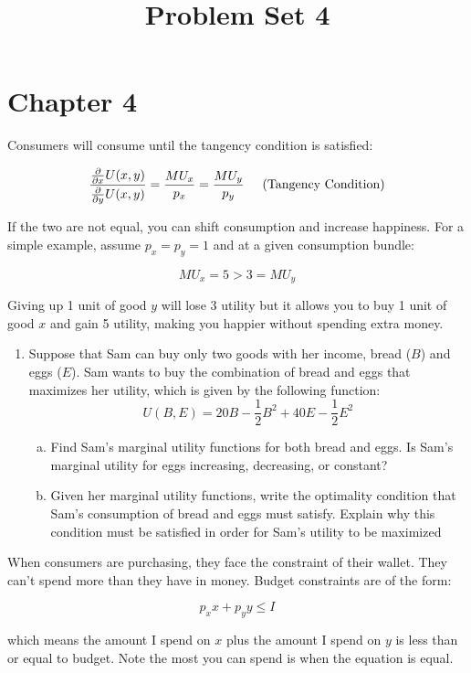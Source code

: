 \documentclass[11pt]{article}
\title{Problem Set 4}
\begin{document}
  
\section*{Chapter 4}

\begin{tcolorbox}[title= {\bf Optimal Consumption:}]
  Consumers will consume until the tangency condition is satisfied:

  $$\frac{\frac{\partial}{\partial x} U(x,y)}{\frac{\partial}{\partial y} U(x,y)} =  \frac{MU_x}{p_x} = \frac{MU_y}{p_y} \hspace{5mm} \text{(Tangency Condition)} $$

  \vspace{2.5mm}
  If the two are not equal, you can shift consumption and increase happiness. For a simple example, assume $p_x = p_y = 1$ and at a given consumption bundle:
  
  $$MU_x = 5 > 3 = MU_y$$ 
  
  \vspace{2.5mm}
  Giving up 1 unit of good $y$ will lose 3 utility but it allows you to buy 1 unit of good $x$ and gain 5 utility, making you happier without spending extra money.
\end{tcolorbox}

\begin{enumerate}
  \item Suppose that Sam can buy only two goods with her income, bread ($B$) and eggs ($E$). Sam wants to buy the combination of bread and eggs that maximizes her utility, which is given by the following function:
  $$ 
    U(B,E) = 20B - \frac{1}{2} B^2 + 40E - \frac{1}{2} E^2
  $$

  \begin{enumerate}[(a)]
    \item Find Sam's marginal utility functions for both bread and eggs. Is Sam's marginal utility for eggs increasing, decreasing, or constant?
    

    \vspace*{50mm}
    \item Given her marginal utility functions, write the optimality condition that Sam's consumption of bread and eggs must satisfy. Explain why this condition must be satisfied in order for Sam's utility to be maximized
  
  \end{enumerate}
\end{enumerate}    
  
\newpage
    \begin{tcolorbox}[title= {\bf Budget Constraints}]
      When consumers are purchasing, they face the constraint of their wallet. They can't spend more than they have in money. Budget constraints are of the form: 
      
      $$p_x x + p_y y \leq I$$ 
      
      which means the amount I spend on $x$ plus the amount I spend on $y$ is less than or equal to budget. Note the most you can spend is when the equation is equal.
      \vspace{-2mm}
    \end{tcolorbox}
\end{document}
